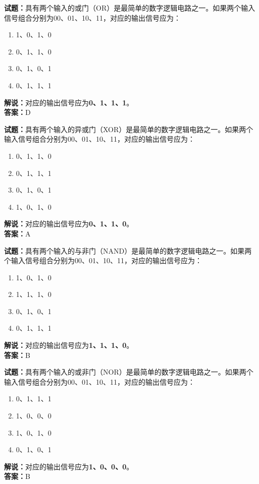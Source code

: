 \documentclass{ctexbook}
\begin{document}
\bigskip


\noindent\textbf{试题：}具有两个输入的或门（OR）是最简单的数字逻辑电路之一。如果两个输入信号组合分别为00、01、10、11，对应的输出信号应为：
\begin{enumerate}[leftmargin=3em]
\item 1、0、1、0
\item 0、1、1、0
\item 0、1、0、1
\item 0、1、1、1
\end{enumerate}
\noindent\textbf{解说：}对应的输出信号应为\textbf{0、1、1、1}。\\\noindent\textbf{答案：}D



\bigskip


\noindent\textbf{试题：}具有两个输入的异或门（XOR）是最简单的数字逻辑电路之一。如果两个输入信号组合分别为00、01、10、11，对应的输出信号应为：
\begin{enumerate}[leftmargin=3em]
\item 0、1、1、0
\item 0、1、1、1
\item 0、1、0、1
\item 1、0、1、0
\end{enumerate}
\noindent\textbf{解说：}对应的输出信号应为\textbf{0、1、1、0}。\\\noindent\textbf{答案：}A




\bigskip


\noindent\textbf{试题：}具有两个输入的与非门（NAND）是最简单的数字逻辑电路之一。如果两个输入信号组合分别为00、01、10、11，对应的输出信号应为：
\begin{enumerate}[leftmargin=3em]
\item 1、0、1、0
\item 1、1、1、0
\item 0、1、0、1
\item 0、1、1、1
\end{enumerate}
\noindent\textbf{解说：}对应的输出信号应为\textbf{1、1、1、0}。\\\noindent\textbf{答案：}B






\bigskip


\noindent\textbf{试题：}具有两个输入的或非门（NOR）是最简单的数字逻辑电路之一。如果两个输入信号组合分别为00、01、10、11，对应的输出信号应为：
\begin{enumerate}[leftmargin=3em]
\item 0、1、1、1
\item 1、0、0、0
\item 1、0、1、0
\item 0、1、0、1
\end{enumerate}
\noindent\textbf{解说：}对应的输出信号应为\textbf{1、0、0、0}。\\\noindent\textbf{答案：}B
\end{document}
